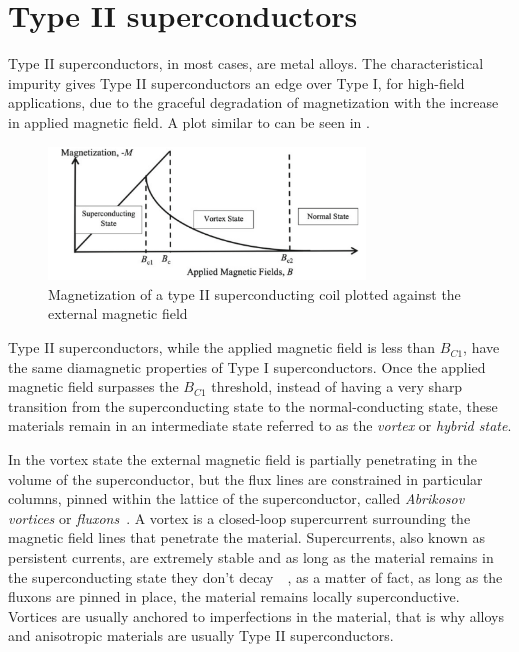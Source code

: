 \section{Type II superconductors}
\label{sec:type2}
Type II superconductors, in most cases, are metal alloys. The characteristical impurity gives Type II superconductors an edge
over Type I, for high-field applications, due to the graceful degradation of magnetization with the increase in applied magnetic
field. A plot similar to  can be seen in .
\begin{figure}[!ht]
	\centering
	\includegraphics[width=0.75\textwidth]{./img/type2.png}
	\caption{Magnetization of a type II superconducting coil plotted against the external
		magnetic field~\cite{slimani2022superconducting}}
	\label{img:type2-transition}
\end{figure}

Type II superconductors, while the applied magnetic field is less than $B_{C1}$, have the same
diamagnetic properties of Type I superconductors. Once the applied magnetic field surpasses the
$B_{C1}$ threshold, instead of having a very sharp transition from the superconducting state to
the normal-conducting state, these materials remain in an intermediate state referred to as the \emph{vortex} or \emph{hybrid state}.

In the vortex state the external magnetic field is partially penetrating in the volume of the superconductor, but the
flux lines are constrained in particular columns, pinned within the lattice of the
superconductor, called \emph{Abrikosov vortices} or \emph{fluxons}~\cite{abrikosov-vortices}.
A vortex is a closed-loop supercurrent surrounding the magnetic field lines that
penetrate the material. Supercurrents, also known as persistent currents, are extremely stable and as long as the material remains in the
superconducting state they don't decay~\cite{fujita-theory-HTS}~\cite{file1963}, as a matter of fact, as long as the
fluxons are pinned in place, the material remains locally superconductive. Vortices are usually anchored to imperfections in the material, that is why alloys and anisotropic materials are usually Type II superconductors.

